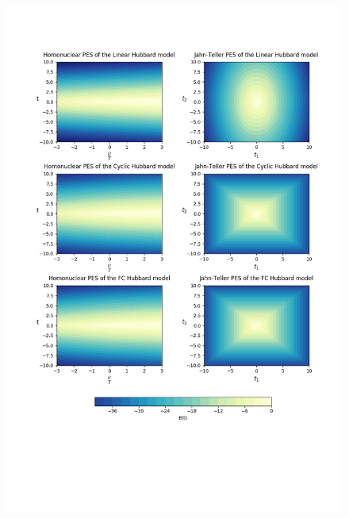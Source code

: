 \documentclass[]{article}
\begin{document}
\begin{figure}[htb]
\centering
\includegraphics[width=\textwidth, height=0.7\textheight]{"PES overview"}
\end{figure}
\\
\\
\end{document}
